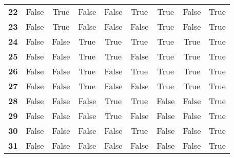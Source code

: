 \begin{tabular}{c|cccccccc}
\textbf{22} & False & True & False & False & True & True & False & True\\
\textbf{23} & False & True & False & False & False & True & False & True\\
\textbf{24} & False & False & True & True & True & True & True & True\\
\textbf{25} & False & False & True & True & False & True & True & True\\
\textbf{26} & False & False & True & False & True & True & True & True\\
\textbf{27} & False & False & True & False & False & True & True & True\\
\textbf{28} & False & False & False & True & True & False & False & True\\
\textbf{29} & False & False & False & True & False & False & False & True\\
\textbf{30} & False & False & False & False & True & False & False & True\\
\textbf{31} & False & False & False & False & False & False & False & True\\
\end{tabular}